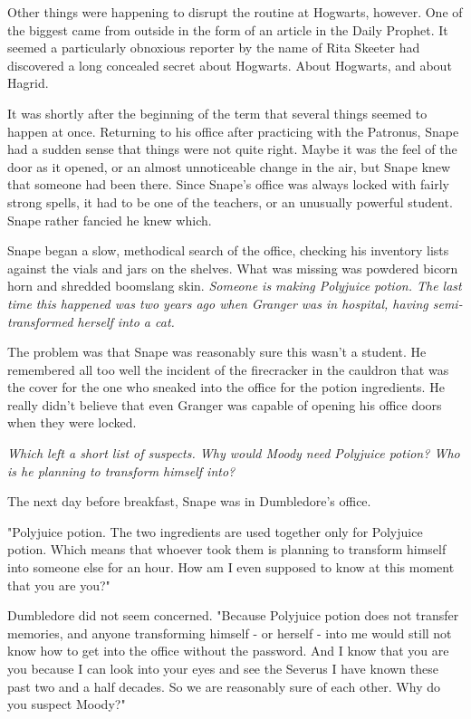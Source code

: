 \documentclass[a4paper,11pt]{article}
\begin{document}
Other things were happening to disrupt the routine at Hogwarts, however. One of the biggest came from outside in the form of an article in the Daily Prophet. It seemed a particularly obnoxious reporter by the name of Rita Skeeter had discovered a long concealed secret about Hogwarts. About Hogwarts, and about Hagrid.

It was shortly after the beginning of the term that several things seemed to happen at once. Returning to his office after practicing with the Patronus, Snape had a sudden sense that things were not quite right. Maybe it was the feel of the door as it opened, or an almost unnoticeable change in the air, but Snape knew that someone had been there. Since Snape's office was always locked with fairly strong spells, it had to be one of the teachers, or an unusually powerful student. Snape rather fancied he knew which.

Snape began a slow, methodical search of the office, checking his inventory lists against the vials and jars on the shelves. What was missing was powdered bicorn horn and shredded boomslang skin. \emph{Someone is making Polyjuice potion. The last time this happened was two years ago when Granger was in hospital, having semi-transformed herself into a cat.}

The problem was that Snape was reasonably sure this wasn't a student. He remembered all too well the incident of the firecracker in the cauldron that was the cover for the one who sneaked into the office for the potion ingredients. He really didn't believe that even Granger was capable of opening his office doors when they were locked.

\emph{Which left a short list of suspects. Why would Moody need Polyjuice potion? Who is he planning to transform himself into?}

The next day before breakfast, Snape was in Dumbledore's office.

"Polyjuice potion. The two ingredients are used together only for Polyjuice potion. Which means that whoever took them is planning to transform himself into someone else for an hour. How am I even supposed to know at this moment that you are you?"

Dumbledore did not seem concerned. "Because Polyjuice potion does not transfer memories, and anyone transforming himself - or herself - into me would still not know how to get into the office without the password. And I know that you are you because I can look into your eyes and see the Severus I have known these past two and a half decades. So we are reasonably sure of each other. Why do you suspect Moody?"
\end{document}
